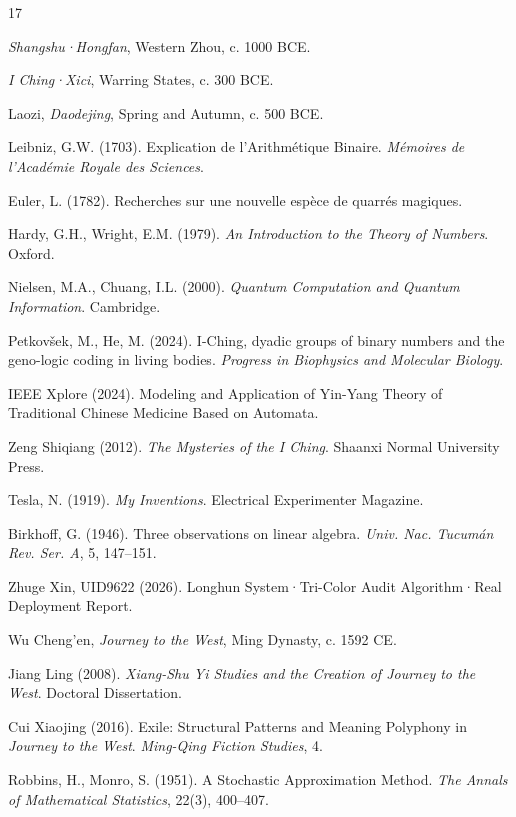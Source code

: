 \documentclass[conference]{IEEEtran}
\theoremstyle{remark}
\begin{document}
\begin{thebibliography}{17}

\emph{Shangshu·Hongfan}, Western Zhou, c. 1000 BCE.

\emph{I Ching·Xici}, Warring States, c. 300 BCE.

Laozi, \emph{Daodejing}, Spring and Autumn, c. 500 BCE.

Leibniz, G.W. (1703). Explication de l'Arithm\'{e}tique Binaire. \emph{M\'{e}moires de l'Acad\'{e}mie Royale des Sciences}.

Euler, L. (1782). Recherches sur une nouvelle esp\`{e}ce de quarr\'{e}s magiques.

Hardy, G.H., Wright, E.M. (1979). \emph{An Introduction to the Theory of Numbers}. Oxford.

Nielsen, M.A., Chuang, I.L. (2000). \emph{Quantum Computation and Quantum Information}. Cambridge.

Petkov\v{s}ek, M., He, M. (2024). I-Ching, dyadic groups of binary numbers and the geno-logic coding in living bodies. \emph{Progress in Biophysics and Molecular Biology}.

IEEE Xplore (2024). Modeling and Application of Yin-Yang Theory of Traditional Chinese Medicine Based on Automata.

Zeng Shiqiang (2012). \emph{The Mysteries of the I Ching}. Shaanxi Normal University Press.

Tesla, N. (1919). \emph{My Inventions}. Electrical Experimenter Magazine.

Birkhoff, G. (1946). Three observations on linear algebra. \emph{Univ. Nac. Tucum\'{a}n Rev. Ser. A}, 5, 147--151.

Zhuge Xin, UID9622 (2026). Longhun System·Tri-Color Audit Algorithm·Real Deployment Report.

Wu Cheng'en, \emph{Journey to the West}, Ming Dynasty, c. 1592 CE.

Jiang Ling (2008). \emph{Xiang-Shu Yi Studies and the Creation of Journey to the West}. Doctoral Dissertation.

Cui Xiaojing (2016). Exile: Structural Patterns and Meaning Polyphony in \emph{Journey to the West}. \emph{Ming-Qing Fiction Studies}, 4.

Robbins, H., Monro, S. (1951). A Stochastic Approximation Method. \emph{The Annals of Mathematical Statistics}, 22(3), 400--407.

\end{thebibliography}
\end{document}
